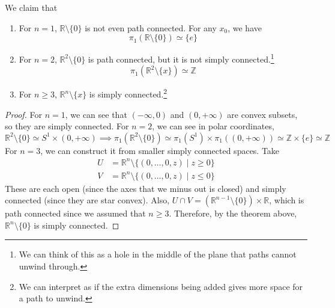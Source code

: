   \begin{theorem}
    We claim that 
    \begin{enumerate}
      \item For $n = 1$, $\mathbb{R} \setminus \{0\}$ is not even path connected. For any $x_0$, we have 
        \begin{equation}
          \pi_1 (\mathbb{R} \setminus \{0\}) \simeq \{e\}
        \end{equation}

      \item For $n = 2$, $\mathbb{R}^2 \setminus \{0\}$ is path connected, but it is not simply connected.\footnote{We can think of this as a hole in the middle of the plane that paths cannot unwind through.}
        \begin{equation}
          \pi_1(\mathbb{R}^2 \setminus \{x\}) \simeq \mathbb{Z}
        \end{equation}

      \item For $n \geq 3$, $\mathbb{R}^n \setminus \{x\}$ is simply connected.\footnote{We can interpret as if the extra dimensions being added gives more space for a path to unwind.}
    \end{enumerate}
  \end{theorem}
  \begin{proof}
    For $n = 1$, we can see that $(-\infty, 0)$ and $(0, +\infty)$ are convex subsets, so they are simply connected. For $n = 2$, we can see in polar coordinates, 
    \begin{equation}
      \mathbb{R}^2 \setminus \{0\} \simeq S^1 \times (0, +\infty) \implies \pi_1 (\mathbb{R}^2 \setminus \{0\}) \simeq \pi_1 (S^1) \times \pi_1 ((0, +\infty)) \simeq \mathbb{Z} \times \{e\} \simeq \mathbb{Z}
    \end{equation}
    For $n = 3$, we can construct it from smaller simply connected spaces. Take 
    \begin{align}
      U & = \mathbb{R}^n \setminus \{(0, \ldots, 0, z) \mid z \geq 0\} \\
      V & = \mathbb{R}^n \setminus \{(0, \ldots, 0, z) \mid z \leq 0\}
    \end{align}
    These are each open (since the axes that we minus out is closed) and simply connected (since they are star convex). Also, $U \cap V = (\mathbb{R}^{n-1} \setminus \{0\}) \times \mathbb{R}$, which is path connected since we assumed that $n \geq 3$. Therefore, by the theorem above, $\mathbb{R}^n \setminus \{0\}$ is simply connected. 
  \end{proof}

